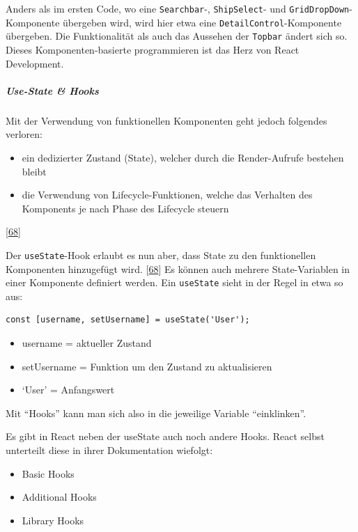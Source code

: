 \documentclass[
    headings=optiontotocandhead,%
    twoside,
    numbers=noenddot,%
    12pt, %
    titlepage, %
    parskip=full, %
    listof=leveldown, 
    numbers=noenddot, %
    a4paper,DIV=14,
    BCOR=15mm,
]{scrbook}
\newcommand{\passthrough}[1]{#1}
\providecommand{\tightlist}{%
  \setlength{\itemsep}{0pt}\setlength{\parskip}{0pt}}
\begin{document}
Anders als im ersten Code, wo eine \passthrough{\lstinline!Searchbar!}-,
\passthrough{\lstinline!ShipSelect!}- und
\passthrough{\lstinline!GridDropDown!}-Komponente übergeben wird, wird
hier etwa eine \passthrough{\lstinline!DetailControl!}-Komponente
übergeben. Die Funktionalität als auch das Aussehen der
\passthrough{\lstinline!Topbar!} ändert sich so. Dieses
Komponenten-basierte programmieren ist das Herz von React Development.

\hypertarget{use-state-hooks}{%
\subparagraph{Use-State \& Hooks}\label{use-state-hooks}}

Mit der Verwendung von funktionellen Komponenten geht jedoch folgendes
verloren:

\begin{itemize}
\tightlist
\item
  ein dedizierter Zustand (State), welcher durch die Render-Aufrufe
  bestehen bleibt
\item
  die Verwendung von Lifecycle-Funktionen, welche das Verhalten des
  Komponents je nach Phase des Lifecycle steuern
\end{itemize}

{[}\protect\hyperlink{ref-GeeksForGeeks-useState}{68}{]}

Der \passthrough{\lstinline!useState!}-Hook erlaubt es nun aber, dass
State zu den funktionellen Komponenten hinzugefügt wird.
{[}\protect\hyperlink{ref-GeeksForGeeks-useState}{68}{]} Es können auch
mehrere State-Variablen in einer Komponente definiert werden. Ein
\passthrough{\lstinline!useState!} sieht in der Regel in etwa so aus:

\begin{lstlisting}[caption={Beispiel useState Variable}]
const [username, setUsername] = useState('User');
\end{lstlisting}

\begin{itemize}
\tightlist
\item
  username = aktueller Zustand
\item
  setUsername = Funktion um den Zustand zu aktualisieren
\item
  `User' = Anfangswert
\end{itemize}

Mit ``Hooks'' kann man sich also in die jeweilige Variable
``einklinken''.

Es gibt in React neben der useState auch noch andere Hooks. React selbst
unterteilt diese in ihrer Dokumentation wiefolgt:

\begin{itemize}
\tightlist
\item
  Basic Hooks
\item
  Additional Hooks
\item
  Library Hooks
\end{itemize}
\end{document}
